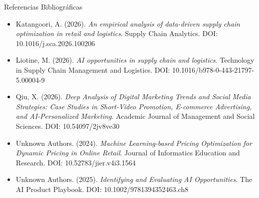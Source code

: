 \documentclass[aspectratio=169]{beamer}
\begin{document}
\begin{frame}{Referencias Bibliográficas}


\begin{itemize}
  \item Katangoori, A. (2026). \textit{An empirical analysis of data-driven supply chain optimization in retail and logistics}. Supply Chain Analytics. DOI: 10.1016/j.sca.2026.100206
  \item Liotine, M. (2026). \textit{AI opportunities in supply chain and logistics}. Technology in Supply Chain Management and Logistics. DOI: 10.1016/b978-0-443-21797-5.00004-9
  \item Qiu, X. (2026). \textit{Deep Analysis of Digital Marketing Trends and Social Media Strategies: Case Studies in Short-Video Promotion, E-commerce Advertising, and AI-Personalized Marketing}. Academic Journal of Management and Social Sciences. DOI: 10.54097/2jv8ve30
  \item Unknown Authors. (2024). \textit{Machine Learning-based Pricing Optimization for Dynamic Pricing in Online Retail}. Journal of Informatics Education and Research. DOI: 10.52783/jier.v4i3.1564
  \item Unknown Authors. (2025). \textit{Identifying and Evaluating AI Opportunities}. The AI Product Playbook. DOI: 10.1002/9781394352463.ch8
\end{itemize}
\end{frame}
\end{document}
